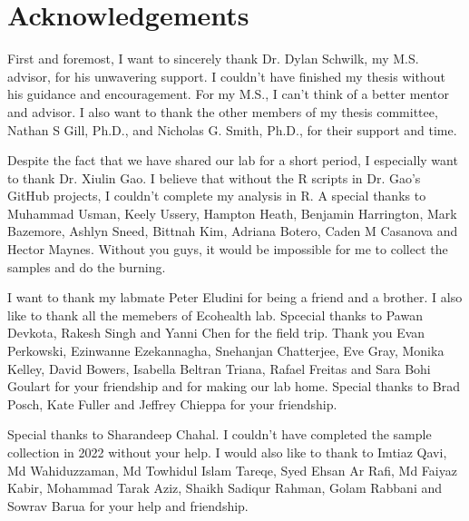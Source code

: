 \documentclass{ttuthes2007}
\begin{document}

\frontmatter

\chapter{\textbf{Acknowledgements}}
First and foremost, I want to sincerely thank Dr. Dylan Schwilk, my M.S. advisor, for his unwavering support. I couldn't have finished my thesis without his guidance and encouragement. For my M.S., I can't think of a better mentor and advisor. I also want to thank the other members of my thesis committee, Nathan S Gill, Ph.D., and Nicholas G. Smith, Ph.D., for their support and time.

Despite the fact that we have shared our lab for a short period, I especially want to thank Dr. Xiulin Gao. I believe that without the R scripts in Dr. Gao's GitHub projects, I couldn't complete my analysis in R. A special thanks to Muhammad Usman, Keely Ussery, Hampton Heath, Benjamin Harrington, Mark Bazemore, Ashlyn Sneed, Bittnah Kim,  Adriana Botero,  Caden M Casanova and Hector Maynes. Without you guys, it would be impossible for me to collect the samples and do the burning.

I want to thank my labmate Peter Eludini for being a friend and a brother. I also like to thank all the memebers of Ecohealth lab. Spcecial thanks to Pawan Devkota,  Rakesh Singh and Yanni Chen for the field trip. Thank you Evan Perkowski, Ezinwanne Ezekannagha,  Snehanjan Chatterjee, Eve Gray, Monika Kelley, David Bowers, Isabella Beltran Triana, Rafael Freitas and Sara Bohi Goulart for your friendship and for making our lab home. Special thanks to Brad Posch, Kate Fuller and Jeffrey Chieppa for your friendship. 

Special thanks to  Sharandeep Chahal. I couldn't have completed the sample collection in 2022 without your help. I would also like to thank to Imtiaz Qavi,  Md Wahiduzzaman,
Md Towhidul Islam Tareqe, Syed Ehsan Ar Rafi, Md Faiyaz Kabir, Mohammad Tarak Aziz, Shaikh Sadiqur Rahman, Golam Rabbani and Sowrav Barua for your help and friendship.
\end{document}
